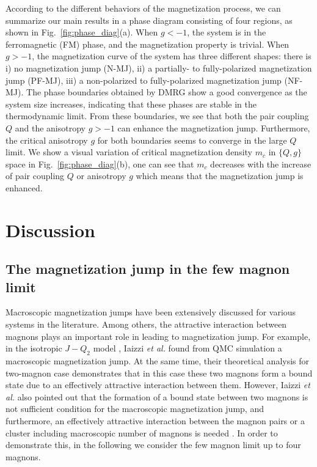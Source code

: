 \documentclass[article,10pt,onecolumn,superscriptaddress,floatfix]{revtex4}
\begin{document}
According to the different behaviors of the magnetization process, we can summarize our main results in a phase diagram consisting of four regions, as shown in Fig.~\ref{fig:phase_diag}(a). When $g<-1$, the system is in the ferromagnetic (FM) phase, and the magnetization property is trivial. When $g>-1$, the magnetization curve of the system has three different shapes: there is  i) no magnetization jump (N-MJ), ii) a partially- to fully-polarized magnetization jump (PF-MJ), iii) a non-polarized to fully-polarized magnetization jump (NF-MJ). The phase boundaries obtained by DMRG show a good convergence as the system size increases, indicating that these phases are stable in the thermodynamic limit. From these boundaries, we see that both the pair coupling $Q$ and the anisotropy $g>-1$ can enhance the magnetization jump. Furthermore, the critical anisotropy $g$ for both boundaries seems to converge in the large $Q$ limit. We show a visual variation of critical magnetization density $m_{c}$ in $\{Q,g\}$ space in Fig.~\ref{fig:phase_diag}(b), one can see that $m_{c}$ decreases with the increase of pair coupling $Q$ or anisotropy $g$ which means that the magnetization jump is enhanced.

\section{Discussion}
\label{sec_4}
\subsection{The magnetization jump in the few magnon limit}
Macroscopic magnetization jumps have been extensively discussed for various systems in the literature\cite{Heidrich2006,Kecke2007,Heidrich2009,Adam2016}. Among others, the attractive interaction between magnons plays an important role in leading to magnetization jump. For example, in the isotropic $J-Q_{2}$ model \cite{Adam2016}, Iaizzi \textit{et al.} found from QMC simulation a macroscopic magnetization jump. At the same time, their theoretical analysis for two-magnon case demonstrates that in this case these two magnons form a bound state due to an effectively attractive interaction between them. However, Iaizzi \textit{et al.} also pointed out that the formation of a bound state between two magnons is not sufficient condition for the macroscopic magnetization jump, and furthermore, an effectively attractive interaction between the magnon pairs or a cluster including macroscopic number of magnons is needed \cite{Adam2016,Heidrich2006,Kecke2007,Heidrich2009}. In order to demonstrate this, in the following we consider the few magnon limit up to four magnons.
\end{document}
